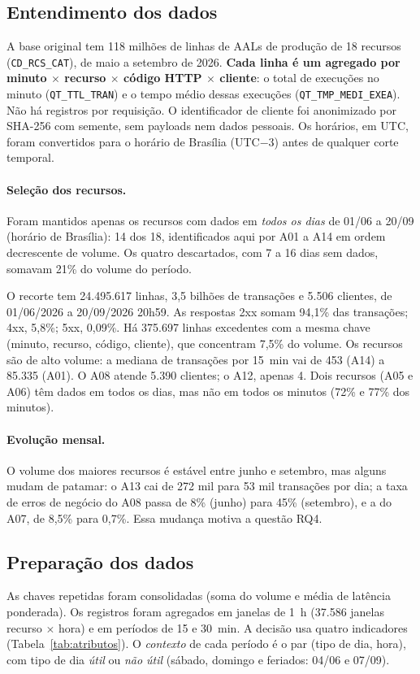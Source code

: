 \documentclass[sigconf,nonacm]{acmart}
\begin{document}
\subsection{Entendimento dos dados}
A base original tem 118 milhões de linhas de AALs de produção de 18 recursos (\texttt{CD\_RCS\_CAT}), de maio a setembro de 2026. \textbf{Cada linha é um agregado por minuto $\times$ recurso $\times$ código HTTP $\times$ cliente}: o total de execuções no minuto (\texttt{QT\_TTL\_TRAN}) e o tempo médio dessas execuções (\texttt{QT\_TMP\_MEDI\_EXEA}). Não há registros por requisição. O identificador de cliente foi anonimizado por SHA-256 com semente, sem payloads nem dados pessoais. Os horários, em UTC, foram convertidos para o horário de Brasília (UTC$-3$) antes de qualquer corte temporal.

\paragraph{Seleção dos recursos.} Foram mantidos apenas os recursos com dados em \emph{todos os dias} de 01/06 a 20/09 (horário de Brasília): 14 dos 18, identificados aqui por A01 a A14 em ordem decrescente de volume. Os quatro descartados, com 7 a 16 dias sem dados, somavam 21\% do volume do período.

O recorte tem 24.495.617 linhas, 3,5 bilhões de transações e 5.506 clientes, de 01/06/2026 a 20/09/2026 20h59. As respostas 2xx somam 94,1\% das transações; 4xx, 5,8\%; 5xx, 0,09\%. Há 375.697 linhas excedentes com a mesma chave (minuto, recurso, código, cliente), que concentram 7,5\% do volume. Os recursos são de alto volume: a mediana de transações por 15~min vai de 453 (A14) a 85.335 (A01). O A08 atende 5.390 clientes; o A12, apenas 4. Dois recursos (A05 e A06) têm dados em todos os dias, mas não em todos os minutos (72\% e 77\% dos minutos).

\paragraph{Evolução mensal.} O volume dos maiores recursos é estável entre junho e setembro, mas alguns mudam de patamar: o A13 cai de 272 mil para 53 mil transações por dia; a taxa de erros de negócio do A08 passa de 8\% (junho) para 45\% (setembro), e a do A07, de 8,5\% para 0,7\%. Essa mudança motiva a questão RQ4.

\subsection{Preparação dos dados}
As chaves repetidas foram consolidadas (soma do volume e média de latência ponderada). Os registros foram agregados em janelas de 1~h (37.586 janelas recurso $\times$ hora) e em períodos de 15 e 30~min. A decisão usa quatro indicadores (Tabela~\ref{tab:atributos}). O \emph{contexto} de cada período é o par (tipo de dia, hora), com tipo de dia \emph{útil} ou \emph{não útil} (sábado, domingo e feriados: 04/06 e 07/09).
\end{document}
